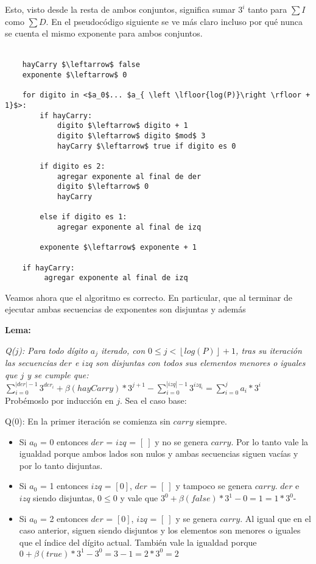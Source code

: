 	Esto, visto desde la resta de ambos conjuntos, significa sumar $3^{i}$ tanto para $\sum I$ como $\sum D$. En el pseudocódigo siguiente se ve más claro incluso por qué nunca se cuenta el mismo exponente para ambos conjuntos.
\\
\\
\begin{lstlisting}
    hayCarry $\leftarrow$ false
    exponente $\leftarrow$ 0

    for digito in <$a_0$... $a_{ \left \lfloor{log(P)}\right \rfloor + 1}$>:
        if hayCarry:
            digito $\leftarrow$ digito + 1
            digito $\leftarrow$ digito $mod$ 3
            hayCarry $\leftarrow$ true if digito es 0

        if digito es 2:
            agregar exponente al final de der
            digito $\leftarrow$ 0
            hayCarry

        else if digito es 1:
            agregar exponente al final de izq

        exponente $\leftarrow$ exponente + 1

    if hayCarry:
         agregar exponente al final de izq

\end{lstlisting}

	Veamos ahora que el algoritmo es correcto. En particular, que al terminar de ejecutar ambas secuencias de exponentes son disjuntas y además

	\begin{center}
		\textbf{Lema:}
	\end{center}

	\emph{
	Q($j$): Para todo dígito $a_j$ iterado, con $0 \leq j < \left \lfloor{log(P)}\right \rfloor + 1$, tras su iteración las secuencias $der$ e $izq$ son disjuntas con todos sus elementos menores o iguales que $j$ y se cumple que:
	}
	\\

	$\sum_{i=0}^{|der|-1} 3^{der_i} + \beta(hayCarry)*3^{j+1} - \sum_{i=0}^{|izq|-1} 3^{izq_i} = \sum_{i=0}^{j} a_i*3^{i} $
	\\

	Probémoslo por inducción en $j$. Sea el caso base:

	Q($0$): En la primer iteración se comienza sin $carry$ siempre.

	\begin{itemize}
	\item Si $a_0$ = 0 entonces $der$ = $izq$ = $[\ ]$ y no se genera $carry$. Por lo tanto vale la igualdad porque ambos lados son nulos y ambas secuencias siguen vacías y por lo tanto disjuntas.
	\item Si $a_0$ = 1 entonces $izq$ = $[0]$, $der$ = $[\ ]$ y tampoco se genera $carry$. $der$ e $izq$ siendo disjuntas, $0 \leq 0$ y vale que $3^{0} + \beta(false)*3^{1} - 0 = 1 = 1*3^{0}$-
	\item Si $a_0$ = 2 entonces $der$ = $[0]$, $izq$ = $[\ ]$ y se genera $carry$. Al igual que en el caso anterior, siguen siendo disjuntos y los elementos son menores o iguales que el índice del dígito actual. También vale la igualdad porque $0 + \beta(true)*3^{1} - 3^{0} = 3 - 1 = 2*3^{0} = 2$
	\end{itemize}


